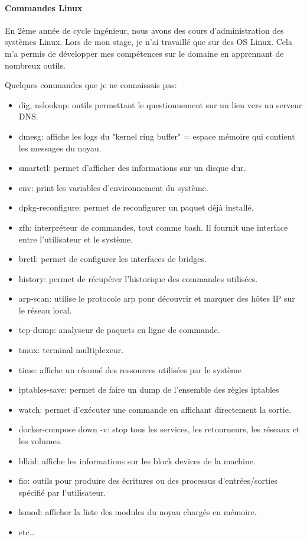\documentclass[12pt]{article}
\begin{document}
\paragraph{Commandes Linux}
En 2ème année de cycle ingénieur, nous avons des cours d'administration des systèmes Linux.
Lors de mon stage, je n'ai travaillé que sur des OS Linux.
Cela m'a permis de développer mes compétences sur le domaine en apprennant de nombreux outils.

Quelques commandes que je ne connaissais pas:
\begin{itemize}
    \item dig, nslookup: outils permettant le questionnement sur un lien vers un serveur DNS. 
    \item dmesg: affiche les logs du "kernel ring buffer" = espace mémoire qui contient les messages du noyau.
    \item smartctl: permet d'afficher des informations sur un disque dur. 
    \item env: print les variables d'environnement du système.
    \item dpkg-reconfigure: permet de reconfigurer un paquet déjà installé.
    \item zfh: interpréteur de commandes, tout comme bash. 
    Il fournit une interface entre l'utilisateur et le système.
    \item brctl: permet de configurer les interfaces de bridges.
    \item history: permet de récupérer l'historique des commandes utilisées.
    \item arp-scan: utilise le protocole arp pour découvrir et marquer des hôtes IP sur le réseau local.
    \item tcp-dump: analyseur de paquets en ligne de commande.
    \item tmux: terminal multiplexeur.
    \item time: affiche un résumé des ressources utilisées par le système
    \item iptables-save: permet de faire un dump de l'ensemble des règles iptables
    \item watch: permet d'exécuter une commande en affichant directement la sortie.
    \item docker-compose down -v: stop tous les services, les retourneurs, les réseaux et les volumes.
    \item blkid: affiche les informations sur les block devices de la machine.
    \item fio: outils pour produire des écritures ou des processus d'entrées/sorties spécifié par l'utilisateur.
    \item lsmod: afficher la liste des modules du noyau chargés en mémoire. 
    \item etc\dots
\end{itemize}
\end{document}
